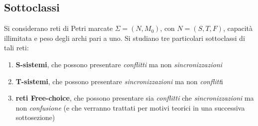 \documentclass[a4paper,12pt, oneside]{book}
\begin{document}
\subsection{Sottoclassi}
Si considerano reti di Petri marcate $\Sigma = (N,M_0)$, con $N=(S,T,F)$,
capacità illimitata e peso degli archi pari a uno. Si studiano tre particolari
sottoclassi di tali reti:
\begin{enumerate}
  \item \textbf{S-sistemi}, che possono presentare \textit{conflitti} ma non
  \textit{sincronizzazioni} 
  \item \textbf{T-sistemi}, che possono presentare \textit{sincronizzazioni} ma
  non \textit{conflitt}i
  \item \textbf{reti Free-choice}, che possono presentare sia \textit{conflitti}
  che \textit{sincronizzazioni} ma non \textit{confusione} (e che verranno
  trattati per motivi teorici in una successiva sottosezione)
\end{enumerate}
\end{document}

